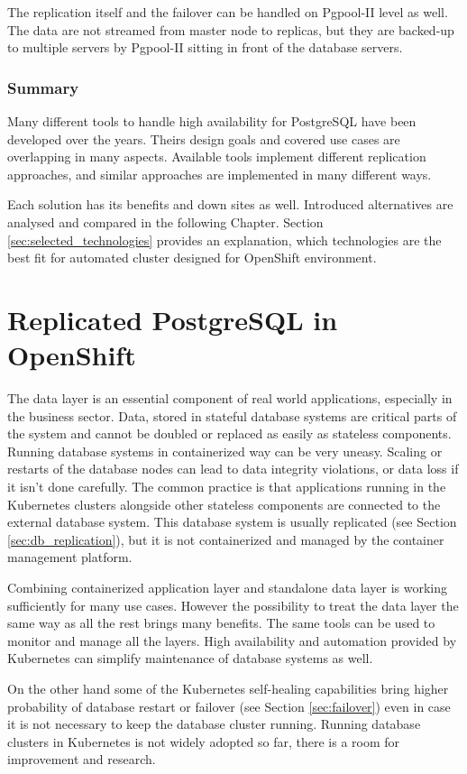 \documentclass[
  digital, %
  twoside, %
  table,   %
  lof,     %
  lot,     %
]{fithesis3}
\begin{document}
The replication itself and the failover can be handled on Pgpool-II level as well. The data are not streamed from master node to replicas, but they are backed-up to multiple servers by Pgpool-II sitting in front of the database servers.

\subsection{Summary}
Many different tools to handle high availability for PostgreSQL have been developed over the years. Theirs design goals and covered use cases are overlapping in many aspects. Available tools implement different replication approaches, and similar approaches are implemented in many different ways.

Each solution has its benefits and down sites as well. Introduced alternatives are analysed and compared in the following Chapter. Section \ref{sec:selected_technologies} provides an explanation, which technologies are the best fit for automated cluster designed for OpenShift environment.

\chapter{Replicated PostgreSQL in OpenShift} \label{chap:pg_in_openshift}
The data layer is an essential component of real world applications, especially in the business sector. Data, stored in stateful database systems are critical parts of the system and cannot be doubled or replaced as easily as stateless components. Running database systems in containerized way can be very uneasy. Scaling or restarts of the database nodes can lead to data integrity violations, or data loss if it isn't done carefully. The common practice is that applications running in the Kubernetes clusters alongside other stateless components are connected to the external database system. This database system is usually replicated (see Section \ref{sec:db_replication}), but it is not containerized and managed by the container management platform.

Combining containerized application layer and standalone data layer is working sufficiently for many use cases. However the possibility to treat the data layer the same way as all the rest brings many benefits. The same tools can be used to monitor and manage all the layers. High availability and automation provided by Kubernetes can simplify maintenance of database systems as well.

On the other hand some of the Kubernetes self-healing capabilities bring higher probability of database restart or failover (see Section \ref{sec:failover}) even in case it is not necessary to keep the database cluster running. Running database clusters in Kubernetes is not widely adopted so far, there is a room for improvement and research.
\end{document}
